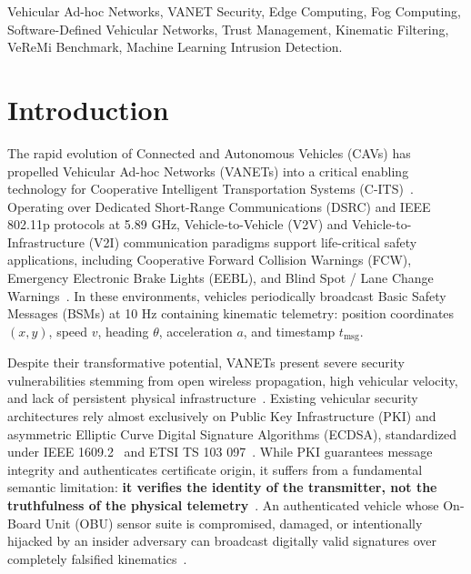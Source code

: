 \documentclass[conference]{IEEEtran}
\begin{document}
\begin{IEEEkeywords}
Vehicular Ad-hoc Networks, VANET Security, Edge Computing, Fog Computing, Software-Defined Vehicular Networks, Trust Management, Kinematic Filtering, VeReMi Benchmark, Machine Learning Intrusion Detection.
\end{IEEEkeywords}


\section{Introduction}

The rapid evolution of Connected and Autonomous Vehicles (CAVs) has propelled Vehicular Ad-hoc Networks (VANETs) into a critical enabling technology for Cooperative Intelligent Transportation Systems (C-ITS)~\cite{raya}. Operating over Dedicated Short-Range Communications (DSRC) and IEEE 802.11p protocols at 5.89 GHz, Vehicle-to-Vehicle (V2V) and Vehicle-to-Infrastructure (V2I) communication paradigms support life-critical safety applications, including Cooperative Forward Collision Warnings (FCW), Emergency Electronic Brake Lights (EEBL), and Blind Spot / Lane Change Warnings~\cite{vanetsecurity}. In these environments, vehicles periodically broadcast Basic Safety Messages (BSMs) at 10 Hz containing kinematic telemetry: position coordinates $(x,y)$, speed $v$, heading $\theta$, acceleration $a$, and timestamp $t_{\text{msg}}$.

Despite their transformative potential, VANETs present severe security vulnerabilities stemming from open wireless propagation, high vehicular velocity, and lack of persistent physical infrastructure~\cite{trustsurvey, kargl2008secure}. Existing vehicular security architectures rely almost exclusively on Public Key Infrastructure (PKI) and asymmetric Elliptic Curve Digital Signature Algorithms (ECDSA), standardized under IEEE 1609.2~\cite{ieee16092} and ETSI TS 103 097~\cite{etsi103097}. While PKI guarantees message integrity and authenticates certificate origin, it suffers from a fundamental semantic limitation: \textbf{it verifies the identity of the transmitter, not the truthfulness of the physical telemetry}~\cite{whyte2013security}. An authenticated vehicle whose On-Board Unit (OBU) sensor suite is compromised, damaged, or intentionally hijacked by an insider adversary can broadcast digitally valid signatures over completely falsified kinematics~\cite{veremi}.
\end{document}
